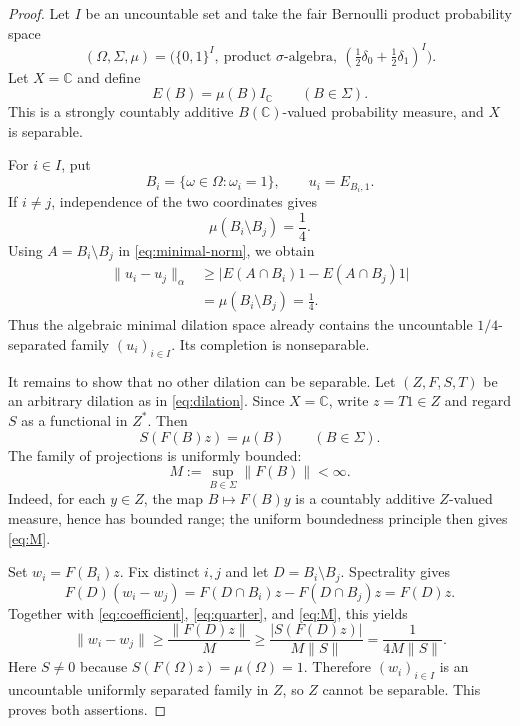 \documentclass[11pt]{article}
\newcommand{\C}{\mathbb C}
\newcommand{\1}{\mathbf 1}
\begin{document}
\begin{proof}
Let $I$ be an uncountable set and take the fair Bernoulli product probability
space
\[
  (\Omega,\Sigma,\mu)
    =\bigl(\{0,1\}^{I},\ \text{product }\sigma\text{-algebra},\
                    (\tfrac12\delta_0+\tfrac12\delta_1)^I\bigr).
\]
Let $X=\C$ and define
\[
                    E(B)=\mu(B)I_\C \qquad(B\in\Sigma).
\]
This is a strongly countably additive $B(\C)$-valued probability measure, and
$X$ is separable.

For $i\in I$, put
\[
             B_i=\{\omega\in\Omega:\omega_i=1\},
             \qquad u_i=E_{B_i,1}.
\]
If $i\ne j$, independence of the two coordinates gives
\begin{equation}\label{eq:quarter}
             \mu(B_i\setminus B_j)=\frac14.
\end{equation}
Using $A=B_i\setminus B_j$ in \eqref{eq:minimal-norm}, we obtain
\[
\begin{split}
 \|u_i-u_j\|_\alpha
 &\geq
 \bigl|E(A\cap B_i)1-E(A\cap B_j)1\bigr|  \\
 &=\mu(B_i\setminus B_j)=\frac14.
\end{split}
\]
Thus the algebraic minimal dilation space already contains the uncountable
$1/4$-separated family $(u_i)_{i\in I}$.  Its completion is nonseparable.

It remains to show that no other dilation can be separable.  Let
$(Z,F,S,T)$ be an arbitrary dilation as in \eqref{eq:dilation}.  Since
$X=\C$, write $z=T1\in Z$ and regard $S$ as a functional in $Z^*$.  Then
\begin{equation}\label{eq:coefficient}
                    S(F(B)z)=\mu(B) \qquad(B\in\Sigma).
\end{equation}
The family of projections is uniformly bounded:
\begin{equation}\label{eq:M}
                       M:=\sup_{B\in\Sigma}\|F(B)\|<\infty.
\end{equation}
Indeed, for each $y\in Z$, the map $B\mapsto F(B)y$ is a countably additive
$Z$-valued measure, hence has bounded range; the uniform boundedness principle
then gives \eqref{eq:M}.

Set $w_i=F(B_i)z$.  Fix distinct $i,j$ and let
$D=B_i\setminus B_j$.  Spectrality gives
\[
 F(D)(w_i-w_j)
   =F(D\cap B_i)z-F(D\cap B_j)z
   =F(D)z.
\]
Together with \eqref{eq:coefficient}, \eqref{eq:quarter}, and
\eqref{eq:M}, this yields
\[
 \|w_i-w_j\|
 \geq \frac{\|F(D)z\|}{M}
 \geq \frac{|S(F(D)z)|}{M\|S\|}
 =\frac{1}{4M\|S\|}.
\]
Here $S\ne0$ because $S(F(\Omega)z)=\mu(\Omega)=1$.
Therefore $(w_i)_{i\in I}$ is an uncountable uniformly separated family in
$Z$, so $Z$ cannot be separable.  This proves both assertions.
\end{proof}
\end{document}
